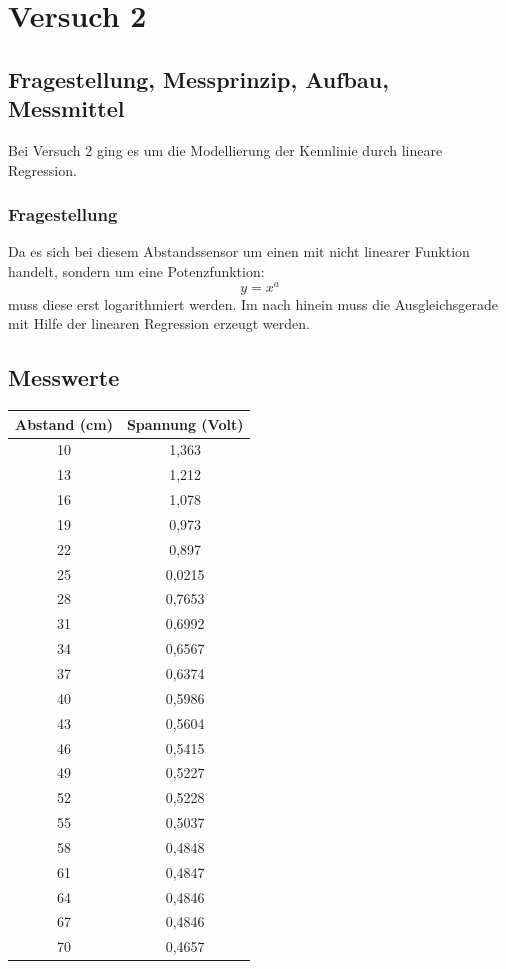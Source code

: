 \chapter{Versuch 2}
\label{chap:VERSUCH_2}

\section{Fragestellung, Messprinzip, Aufbau, Messmittel}
\label{chap:VERSUCH_2_FRAGESTELLUNG}




Bei Versuch 2 ging es um die Modellierung der Kennlinie durch lineare Regression. 

\subsection*{Fragestellung}

	Da es sich bei diesem Abstandssensor um einen mit nicht linearer Funktion handelt, sondern um eine Potenzfunktion:
	\begin{equation*}
  	y = x^a
\end{equation*}
	muss diese erst logarithmiert werden. Im nach hinein muss  die Ausgleichsgerade mit Hilfe der linearen Regression erzeugt werden.


\section{Messwerte}
\label{chap:VERSUCH_2_MESSWERTE}
\begin{center}
\begin{tabular}{|c|c|}
\hline 
Abstand (cm) & Spannung (Volt) \\ 
\hline 
10 & 1,363 \\ 
\hline 
13 & 1,212 \\ 
\hline 
16 & 1,078 \\ 
\hline 
19 & 0,973 \\ 
\hline 
22 & 0,897 \\ 
\hline 
25 & 0,0215 \\ 
\hline 
28 & 0,7653 \\ 
\hline 
31 & 0,6992 \\ 
\hline 
34 & 0,6567 \\ 
\hline 
37 & 0,6374 \\ 
\hline 
40 & 0,5986 \\ 
\hline 
43 & 0,5604 \\ 
\hline 
46 & 0,5415 \\ 
\hline 
49 & 0,5227 \\ 
\hline 
52 & 0,5228 \\ 
\hline 
55 & 0,5037 \\ 
\hline 
58 & 0,4848 \\ 
\hline 
61 & 0,4847 \\ 
\hline 
64 & 0,4846 \\ 
\hline 
67 & 0,4846 \\ 
\hline 
70 & 0,4657 \\ 
\hline 
\end{tabular} 
\label{messdatenBlatt}
\end{center}	
	
